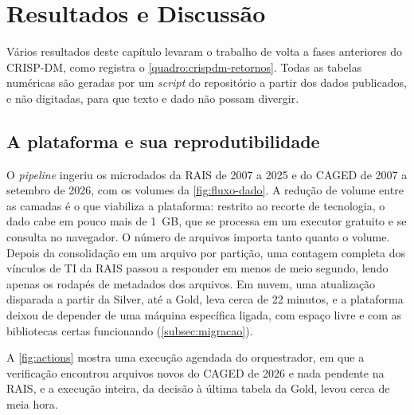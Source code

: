 
\chapter{Resultados e Discussão}
\label{cap:resultados}

Vários resultados deste capítulo levaram o trabalho de volta a fases anteriores do CRISP-DM, como registra o \autoref{quadro:crispdm-retornos}. Todas as tabelas numéricas são geradas por um \textit{script} do repositório a partir dos dados publicados, e não digitadas, para que texto e dado não possam divergir.

\section{A plataforma e sua reprodutibilidade}
\label{sec:reprodutibilidade}

O \textit{pipeline} ingeriu os microdados da RAIS de 2007 a 2025 e do CAGED de 2007 a setembro de 2026, com os volumes da \autoref{fig:fluxo-dado}. A redução de volume entre as camadas é o que viabiliza a plataforma: restrito ao recorte de tecnologia, o dado cabe em pouco mais de 1~GB, que se processa em um executor gratuito e se consulta no navegador. O número de arquivos importa tanto quanto o volume. Depois da consolidação em um arquivo por partição, uma contagem completa dos vínculos de TI da RAIS passou a responder em menos de meio segundo, lendo apenas os rodapés de metadados dos arquivos. Em nuvem, uma atualização disparada a partir da Silver, até a Gold, leva cerca de 22 minutos, e a plataforma deixou de depender de uma máquina específica ligada, com espaço livre e com as bibliotecas certas funcionando (\autoref{subsec:migracao}).

A \autoref{fig:actions} mostra uma execução agendada do orquestrador, em que a verificação encontrou arquivos novos do CAGED de 2026 e nada pendente na RAIS, e a execução inteira, da decisão à última tabela da Gold, levou cerca de meia hora.

